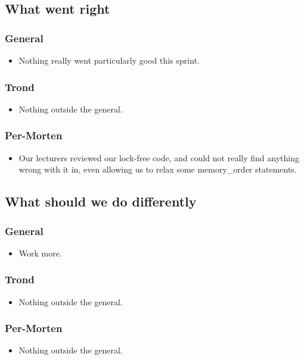 \documentclass{article}
\begin{document}
\subsection*{What went right}
\subsubsection*{General}
\begin{itemize}
    \item
    Nothing really went particularly good this sprint.
\end{itemize}

\subsubsection*{Trond}
\begin{itemize}
    \item
    Nothing outside the general.
\end{itemize}

\subsubsection*{Per-Morten}
\begin{itemize}
    \item
    Our lecturers reviewed our lock-free code, and could not really find anything wrong with it in,
    even allowing us to relax some memory\_order statements.
\end{itemize}

\subsection*{What should we do differently}
\subsubsection*{General}
\begin{itemize}
    \item
    Work more.
\end{itemize}

\subsubsection*{Trond}
\begin{itemize}
    \item
    Nothing outside the general.
\end{itemize}

\subsubsection*{Per-Morten}
\begin{itemize}
    \item
    Nothing outside the general.
\end{itemize}
\end{document}
